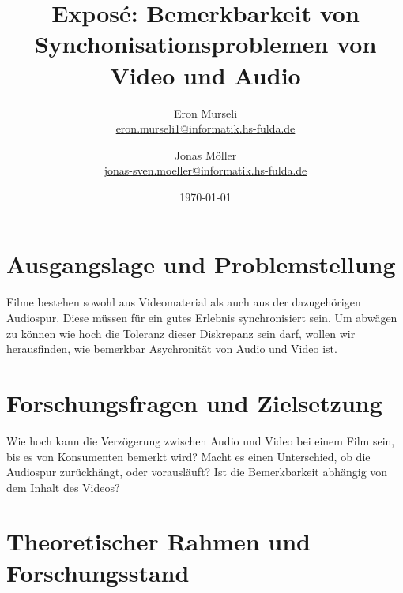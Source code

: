 \documentclass[11pt,a4paper]{article}
\title{Exposé: Bemerkbarkeit von Synchonisationsproblemen von Video und Audio} %
\author{%
\large Eron Murseli \\ %
\normalsize \href{mailto:eron.murseli1@informatik.hs-fulda.de}{eron.murseli1@informatik.hs-fulda.de}
\and
\large Jonas Möller \\ %
\normalsize \href{mailto:jonas-sven.moeller@informatik.hs-fulda.de}{jonas-sven.moeller@informatik.hs-fulda.de}
}
\date{\today} %
\begin{document}
\maketitle



\section{Ausgangslage und Problemstellung}

Filme bestehen sowohl aus Videomaterial als auch aus der dazugehörigen Audiospur.
Diese müssen für ein gutes Erlebnis synchronisiert sein.
Um abwägen zu können wie hoch die Toleranz dieser Diskrepanz sein darf, wollen wir herausfinden, wie bemerkbar Asychronität von Audio und Video ist.

\section{Forschungsfragen und Zielsetzung}

Wie hoch kann die Verzögerung zwischen Audio und Video bei einem Film sein, bis es von Konsumenten bemerkt wird?
Macht es einen Unterschied, ob die Audiospur zurückhängt, oder vorausläuft?
Ist die Bemerkbarkeit abhängig von dem Inhalt des Videos?

\section{Theoretischer Rahmen und Forschungsstand}
\end{document}
